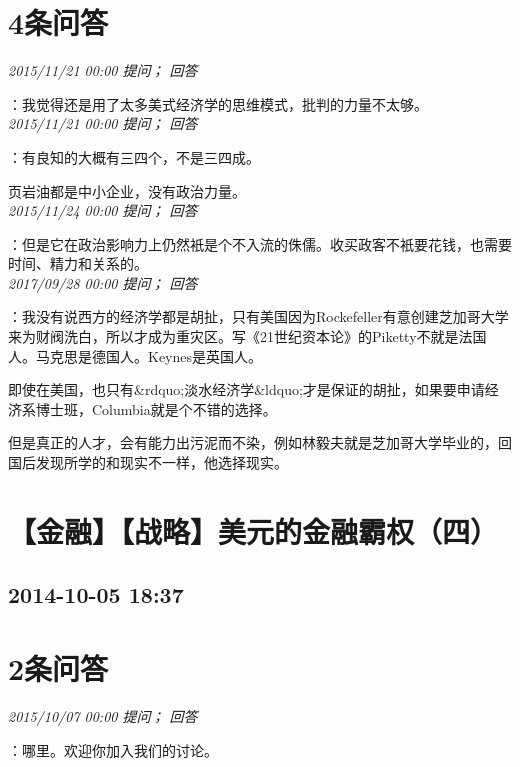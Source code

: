 \documentclass[twocolumn]{ctexart}
\begin{document}
\section{4条问答}

\textit{\hfill\noindent\small 2015/11/21 00:00 提问； 回答}

：我觉得还是用了太多美式经济学的思维模式，批判的力量不太够。\\

\textit{\hfill\noindent\small 2015/11/21 00:00 提问； 回答}

：有良知的大概有三四个，不是三四成。

页岩油都是中小企业，没有政治力量。\\

\textit{\hfill\noindent\small 2015/11/24 00:00 提问； 回答}

：但是它在政治影响力上仍然衹是个不入流的侏儒。收买政客不衹要花钱，也需要时间、精力和关系的。\\

\textit{\hfill\noindent\small 2017/09/28 00:00 提问； 回答}

：我没有说西方的经济学都是胡扯，只有美国因为Rockefeller有意创建芝加哥大学来为财阀洗白，所以才成为重灾区。写《21世纪资本论》的Piketty不就是法国人。马克思是德国人。Keynes是英国人。

即使在美国，也只有\&rdquo;淡水经济学\&ldquo;才是保证的胡扯，如果要申请经济系博士班，Columbia就是个不错的选择。

但是真正的人才，会有能力出污泥而不染，例如林毅夫就是芝加哥大学毕业的，回国后发现所学的和现实不一样，他选择现实。\\


\section{【金融】【战略】美元的金融霸权（四）}
\subsection{2014-10-05 18:37}


\section{2条问答}

\textit{\hfill\noindent\small 2015/10/07 00:00 提问； 回答}

：哪里。欢迎你加入我们的讨论。\\
\end{document}
